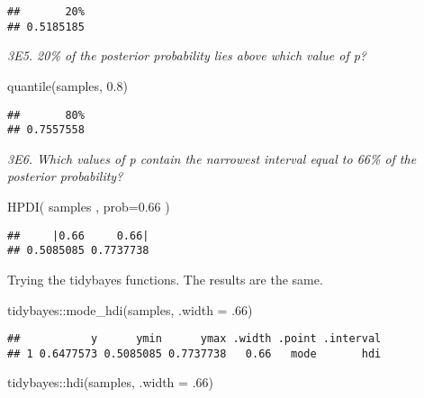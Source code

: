 \documentclass[
]{book}
\newenvironment{Shaded}{\begin{snugshade}}{\end{snugshade}}
\newcommand{\AttributeTok}[1]{\textcolor[rgb]{0.77,0.63,0.00}{#1}}
\newcommand{\DecValTok}[1]{\textcolor[rgb]{0.00,0.00,0.81}{#1}}
\newcommand{\FloatTok}[1]{\textcolor[rgb]{0.00,0.00,0.81}{#1}}
\newcommand{\FunctionTok}[1]{\textcolor[rgb]{0.00,0.00,0.00}{#1}}
\newcommand{\NormalTok}[1]{#1}
\newcommand{\SpecialCharTok}[1]{\textcolor[rgb]{0.00,0.00,0.00}{#1}}
\begin{document}
\begin{verbatim}
##       20% 
## 0.5185185
\end{verbatim}

\emph{3E5. 20\% of the posterior probability lies above which value of p?}

\begin{Shaded}
\begin{Highlighting}[]
\FunctionTok{quantile}\NormalTok{(samples, }\FloatTok{0.8}\NormalTok{)}
\end{Highlighting}
\end{Shaded}

\begin{verbatim}
##       80% 
## 0.7557558
\end{verbatim}

\emph{3E6. Which values of p contain the narrowest interval equal to 66\% of the posterior probability?}

\begin{Shaded}
\begin{Highlighting}[]
\FunctionTok{HPDI}\NormalTok{( samples , }\AttributeTok{prob=}\FloatTok{0.66}\NormalTok{ )}
\end{Highlighting}
\end{Shaded}

\begin{verbatim}
##     |0.66     0.66| 
## 0.5085085 0.7737738
\end{verbatim}

Trying the tidybayes functions. The results are the same.

\begin{Shaded}
\begin{Highlighting}[]
\NormalTok{tidybayes}\SpecialCharTok{::}\FunctionTok{mode\_hdi}\NormalTok{(samples, }\AttributeTok{.width =}\NormalTok{ .}\DecValTok{66}\NormalTok{)}
\end{Highlighting}
\end{Shaded}

\begin{verbatim}
##           y      ymin      ymax .width .point .interval
## 1 0.6477573 0.5085085 0.7737738   0.66   mode       hdi
\end{verbatim}

\begin{Shaded}
\begin{Highlighting}[]
\NormalTok{tidybayes}\SpecialCharTok{::}\FunctionTok{hdi}\NormalTok{(samples, }\AttributeTok{.width =}\NormalTok{ .}\DecValTok{66}\NormalTok{)}
\end{Highlighting}
\end{Shaded}
\end{document}
